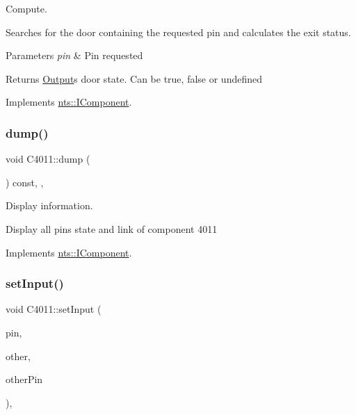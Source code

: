 Compute. 

Searches for the door containing the requested pin and calculates the exit status.


\begin{DoxyParams}{Parameters}
{\em pin} & Pin requested \\
\hline
\end{DoxyParams}
\begin{DoxyReturn}{Returns}
\mbox{\hyperlink{classOutput}{Output}}\textquotesingle{}s door state. Can be true, false or undefined 
\end{DoxyReturn}


Implements \mbox{\hyperlink{classnts_1_1IComponent}{nts\+::\+I\+Component}}.

\mbox{\label{classC4011_a9aa9544c43493bcdf329aea1e475bfd5}} 
\subsubsection{\texorpdfstring{dump()}{dump()}}
{\footnotesize\ttfamily void C4011\+::dump (\begin{DoxyParamCaption}{ }\end{DoxyParamCaption}) const\hspace{0.3cm}{\ttfamily [override]}, {\ttfamily [virtual]}, {\ttfamily [noexcept]}}



Display information. 

Display all pins state and link of component 4011 

Implements \mbox{\hyperlink{classnts_1_1IComponent}{nts\+::\+I\+Component}}.

\mbox{\label{classC4011_a35c72f2ad0d4d0d90de38570901bfcf4}} 
\subsubsection{\texorpdfstring{set\+Input()}{setInput()}}
{\footnotesize\ttfamily void C4011\+::set\+Input (\begin{DoxyParamCaption}\item[{std\+::size\+\_\+t}]{pin,  }\item[{\mbox{\hyperlink{classnts_1_1IComponent}{nts\+::\+I\+Component}} \&}]{other,  }\item[{std\+::size\+\_\+t}]{other\+Pin }\end{DoxyParamCaption})\hspace{0.3cm}{\ttfamily [final]}, {\ttfamily [virtual]}}



